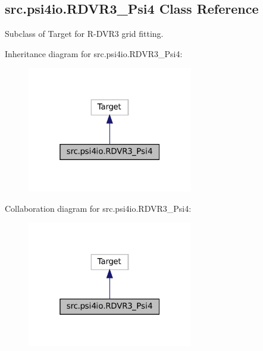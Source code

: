 \hypertarget{classsrc_1_1psi4io_1_1RDVR3__Psi4}{}\subsection{src.\+psi4io.\+R\+D\+V\+R3\+\_\+\+Psi4 Class Reference}
\label{classsrc_1_1psi4io_1_1RDVR3__Psi4}


Subclass of Target for R-\/\+D\+V\+R3 grid fitting.  




Inheritance diagram for src.\+psi4io.\+R\+D\+V\+R3\+\_\+\+Psi4\+:
\nopagebreak
\begin{figure}[H]
\begin{center}
\leavevmode
\includegraphics[width=205pt]{classsrc_1_1psi4io_1_1RDVR3__Psi4__inherit__graph}
\end{center}
\end{figure}


Collaboration diagram for src.\+psi4io.\+R\+D\+V\+R3\+\_\+\+Psi4\+:
\nopagebreak
\begin{figure}[H]
\begin{center}
\leavevmode
\includegraphics[width=205pt]{classsrc_1_1psi4io_1_1RDVR3__Psi4__coll__graph}
\end{center}
\end{figure}
